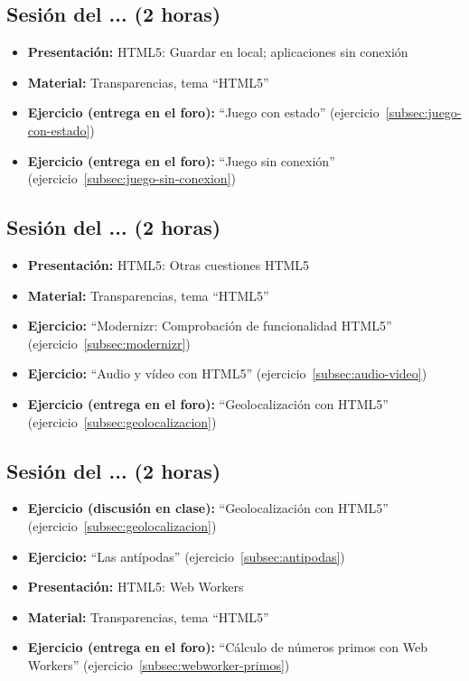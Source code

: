 \documentclass[a4paper,12pt]{report}
\begin{document}
\subsection{Sesión del ... (2 horas)}

\begin{itemize}
 \item \textbf{Presentación:} HTML5: Guardar en local; aplicaciones sin conexión
 \item \textbf{Material:} Transparencias, tema ``HTML5''
 \item \textbf{Ejercicio (entrega en el foro):} ``Juego con estado'' (ejercicio~\ref{subsec:juego-con-estado})
 \item \textbf{Ejercicio (entrega en el foro):} ``Juego sin conexión'' (ejercicio~\ref{subsec:juego-sin-conexion})
\end{itemize}

\subsection{Sesión del ... (2 horas)}

\begin{itemize}
 \item \textbf{Presentación:} HTML5: Otras cuestiones HTML5
 \item \textbf{Material:} Transparencias, tema ``HTML5''
 \item \textbf{Ejercicio:} ``Modernizr: Comprobación de funcionalidad HTML5'' (ejercicio~\ref{subsec:modernizr})
 \item \textbf{Ejercicio:} ``Audio y vídeo con HTML5'' (ejercicio~\ref{subsec:audio-video})
 \item \textbf{Ejercicio (entrega en el foro):} ``Geolocalización con HTML5'' (ejercicio~\ref{subsec:geolocalizacion})
\end{itemize}


\subsection{Sesión del ... (2 horas)}

\begin{itemize}
 \item \textbf{Ejercicio (discusión en clase):} ``Geolocalización con HTML5'' (ejercicio~\ref{subsec:geolocalizacion})
 \item \textbf{Ejercicio:} ``Las antípodas'' (ejercicio~\ref{subsec:antipodas})
 \item \textbf{Presentación:} HTML5: Web Workers
 \item \textbf{Material:} Transparencias, tema ``HTML5''
 \item \textbf{Ejercicio (entrega en el foro):} ``Cálculo de números primos con Web Workers'' (ejercicio~\ref{subsec:webworker-primos})
\end{itemize}
\end{document}
